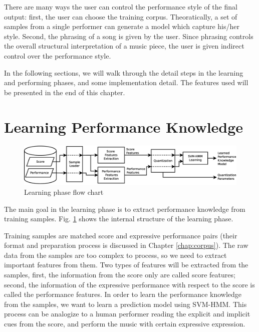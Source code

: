 There are many ways the user can control the performance style of the final output: first, the user can choose the training corpus. Theoratically, a set of samples from a single performer can generate a model which capture his/her style. Second, the phrasing of a song is given by the user. Since phrasing controls the overall structural interpretation of a music piece, the user is given indirect control over the performance style.


In the following sections, we will walk through the detail steps in the learning and performing phases, and some implementation detail. The features used will be presented in the end of this chapter.



\section{Learning Performance Knowledge}
\label{sec:learn}
\begin{figure}[tp]
   \begin{center}
      \includegraphics[width=\textwidth]{fig/learn_arch}
   \end{center}
   \caption{Learning phase flow chart} 
   \label{fig:learnflow}
\end{figure}
The main goal in the learning phase is to extract performance knowledge from training samples. Fig. \ref{fig:learnflow} shows the internal structure of the learning phase.

   Training samples are matched score and expressive performance pairs (their format and preparation process is discussed in Chapter \ref{chap:corpus}). The raw data from the samples are too complex to process, so we need to extract important features from them. Two types of features will be extracted from the samples, first, the information from the score only are called score features; second, the information of the expressive performance with respect to the score is called the performance features. In order to learn the performance knowledge from the samples, we want to learn a prediction model using SVM-HMM. This process can be analogize to a human performer reading the explicit and implicit cues from the score, and perform the music with certain expressive expression. 


